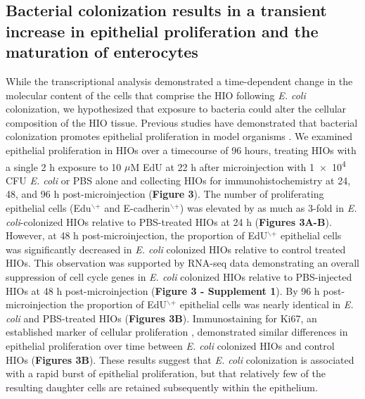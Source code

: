 \documentclass[9pt,lineo]{elife}
\begin{document}
\subsection*{{\bfseries\sffamily } Bacterial colonization results in a transient increase in epithelial proliferation and the maturation of enterocytes}
\label{sec:orgheadline5}
While the transcriptional analysis demonstrated a time-dependent change in the molecular content of the cells that comprise the HIO following \emph{E. coli} colonization, we hypothesized that exposure to bacteria could alter the cellular composition of the HIO tissue. Previous studies have demonstrated that bacterial colonization promotes epithelial proliferation in model organisms \citep{Bates:2006,Cheesman:2011,Neal:2013,Kremer:2013,Ijssennagger:2015}. We examined epithelial proliferation in HIOs over a timecourse of 96 hours, treating HIOs with a single 2 h exposure to 10 \(\mu\)M EdU at 22 h after microinjection with \num{1e4} CFU \emph{E. coli} or PBS alone and collecting HIOs for immunohistochemistry at 24, 48, and 96 h post-microinjection (\textbf{Figure 3}). The number of proliferating epithelial cells (Edu\(^{\text{$\backslash$+}}\) and E-cadherin\(^{\text{$\backslash$+}}\)) was elevated by as much as 3-fold in \emph{E. coli}-colonized HIOs relative to PBS-treated HIOs at 24 h (\textbf{Figures 3A-B}). However, at 48 h post-microinjection, the proportion of EdU\(^{\text{$\backslash$+}}\) epithelial cells was significantly decreased in \emph{E. coli} colonized HIOs relative to control treated HIOs. This observation was supported by RNA-seq data demonstrating an overall suppression of cell cycle genes in \emph{E. coli} colonized HIOs relative to PBS-injected HIOs at 48 h post-microinjection (\textbf{Figure 3 - Supplement 1}). By 96 h post-microinjection the proportion of EdU\(^{\text{$\backslash$+}}\) epithelial cells was nearly identical in \emph{E. coli} and PBS-treated HIOs (\textbf{Figures 3B}). Immunostaining for Ki67, an established marker of cellular proliferation \citep{Gerdes:1984}, demonstrated similar differences in epithelial proliferation over time between \emph{E. coli} colonized HIOs and control HIOs (\textbf{Figures 3B}). These results suggest that \emph{E. coli} colonization is associated with a rapid burst of epithelial proliferation, but that relatively few of the resulting daughter cells are retained subsequently within the epithelium. 
\end{document}
